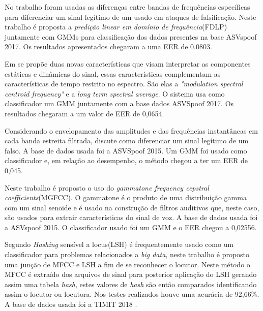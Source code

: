 \begin{myenv}{1.5}
		\par No trabalho \cite{ISI:000465363900139} foram usadas as diferenças entre bandas de frequências específicas para diferenciar um sinal legítimo de um usado em ataques de falsificação. Neste trabalho é proposta a \textit{predição linear em domínio de frequência}(FDLP) juntamente com GMMs para classificação dos dados presentes na base ASVspoof  2017. Os resultados apresentados chegaram a uma EER de 0.0803.
		
		\par Em \cite{Suthokumar2018} se propõe duas novas características que visam interpretar as componentes estáticas e dinâmicas do sinal, essas características complementam as características de tempo restrito no espectro. São elas a \textit{"modulation  spectral  centroid  frequency"} e a \textit{long term spectral average}. O sistema usa como classificador um GMM juntamente com a base dados ASVSpoof 2017. Os resultados chegaram a um valor de EER de 0,0654.
		
		\par Considerando o envelopamento das amplitudes e das frequências instantâneas em cada banda estreita filtrada,  \cite{ISI:000458728700054} discute como diferenciar um sinal legítimo de um falso. A base de dados usada foi a  ASVSpoof 2015. Um GMM foi usado como classificador e, em relação ao desempenho, o método chegou a ter um EER de 0,045.

		\par Neste trabalho \cite{ISI:000392503100008} é proposto o uso do \textit{gammatone frequency cepstral coefficients}(MGFCC). O gammatone é o produto de uma distribuição gamma com um sinal senoide e é usado na construção de filtros auditivos que, neste caso, são usados para extrair características do sinal de voz. A base de dados usada foi a ASVspoof 2015. O classificador usado foi um GMM e o EER chegou a 0,02556.
		
		\par Segundo \cite{8396208} \textit{Hashing} sensível a locus(LSH) é frequentemente usado como um classificador para problemas relacionados a \textit{big data}, neste trabalho é proposto uma junção de MFCC e LSH a fim de se reconhecer o locutor. Neste método o MFCC é extraído dos arquivos de sinal para posterior aplicação do LSH gerando assim uma tabela \textit{hash}, estes valores de \textit{hash} são então comparados identificando assim o locutor ou locutora. Nos testes realizados houve uma acurácia de 92,66\%. A base de dados usada foi a TIMIT 2018 \cite{TIMIT2018}. 

	\end{myenv}